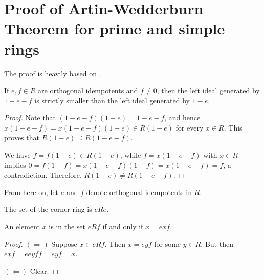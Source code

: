 \section{Proof of Artin-Wedderburn Theorem for prime and simple rings}
The proof is heavily based on \cite{bresar2024wedderburnartintheorem}.
\begin{theorem}
  \label{thm:one_sub_e_larger_span_on_sub_e_sub_f}
  \leanok
  If $e, f \in R$ are orthogonal idempotents and $f \neq 0$, then the left ideal generated by $1 - e - f$ is strictly smaller than the left ideal generated by $1 - e$.
\end{theorem}
\begin{proof}
  \leanok
  Note that $(1 - e - f)(1 - e) = 1 - e - f$, and hence
  $x(1 - e - f) = x(1 - e - f)(1 - e) \in R(1 - e)$
  for every $x \in R$. This proves that $R(1 - e) \supseteq R(1 - e - f)$.

  We have $f = f(1 - e) \in R(1 - e)$, while $f = x(1 - e - f)$ with $x \in R$ implies
  $0 = f(1 - f) = x(1 - e - f)(1 - f) = x(1 - e - f) = f$,
  a contradiction. Therefore, $R(1 - e) \neq R(1 - e - f)$.
\end{proof}

From here on, let $e$ and $f$ denote orthogonal idempotents in $R$.

\begin{definition}
  \label{def:corner_ring}
  \leanok %
  The set of the corner ring is $eRe$.
\end{definition}

\begin{theorem}
  \label{thm:characterization_of_corner_elements}
  \leanok
  An element $x$ is in the set $e R f$ if and only if $x = e x f$.
\end{theorem}
\begin{proof}
  \leanok
  $(\Rightarrow)$ Suppose $x \in e R f$. Then $x = e y f$ for some $y \in R$. But then $e x f = e e y f f = e y f = x$.

  $(\Leftarrow)$ Clear.
\end{proof}


